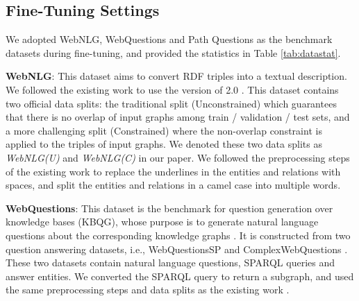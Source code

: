 \documentclass[11pt,a4paper]{article}
\begin{document}
\begin{table*} [!htp]
\centering
\small
{}
\caption{Human evaluation on WebNLG(U). The scores indicate the percentages of win, lose and tie when JointGT is compared with other baselines.  is Fleiss' Kappa (all indicate moderate agreement). The scores marked with * mean  while ** means  in sign test.}
\label{tab:webnlghuman}
\end{table*}


\subsection{Fine-Tuning Settings}


We adopted
WebNLG, WebQuestions and Path Questions as the benchmark datasets during fine-tuning, and provided the statistics in Table \ref{tab:datastat}.

\noindent \textbf{WebNLG}: This dataset aims to convert RDF triples into a textual description. We followed the existing work \cite{chen2020kgpt} to use the version of 2.0 \cite{shimorina2018webnlgv2}. This dataset contains two official data splits: the traditional split (Unconstrained) which guarantees that there is no overlap of input graphs among train / validation / test sets,
and a more challenging split (Constrained) where the non-overlap constraint is applied to the triples of input graphs.
We denoted these two data splits as \textit{WebNLG(U)} and \textit{WebNLG(C)} in our paper. 
We followed the preprocessing steps of the existing work \cite{chen2020kgpt} to replace the underlines in the entities and relations with spaces, and split the entities and relations in a camel case into multiple words.


\noindent \textbf{WebQuestions}: This dataset \cite{yih2016webquestion,talmor2018complexwq} is the benchmark for question generation over knowledge bases (KBQG), whose purpose is to generate natural language questions about the corresponding knowledge graphs \cite{serban2016simplequestion}. 
It is constructed from two question answering datasets, i.e., WebQuestionsSP \cite{yih2016webquestion} and ComplexWebQuestions \cite{talmor2018complexwq}. These two datasets contain natural language questions, SPARQL queries and answer entities. We converted the SPARQL query to return a subgraph, and used the same preprocessing steps and data splits as the existing work \cite{kumar2019mhqg,chen2020bignn}.
\end{document}
